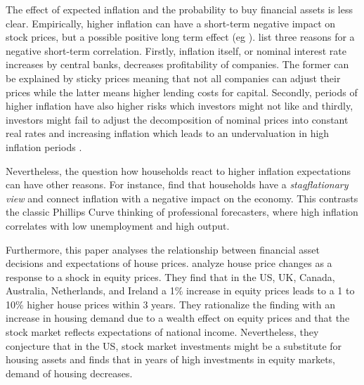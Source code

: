 \documentclass[ProjectABM]{subfiles}
\begin{document}
The effect of expected inflation and the probability to buy financial assets is less clear. Empirically, higher inflation can have a short-term negative impact on stock prices, but a possible positive long term effect (eg \cite{anari_kolari_2001inflation}). \cite{campbell_vuolteenaho_2004inflation} list three reasons for a negative short-term correlation. Firstly, inflation itself, or nominal interest rate increases by central banks, decreases profitability of companies. The former can be explained by sticky prices meaning that not all companies can adjust their prices while the latter means higher lending costs for capital. Secondly, periods of higher inflation have also higher risks which investors might not like and thirdly, investors might fail to adjust the decomposition of nominal prices into constant real rates and increasing inflation which leads to an undervaluation in high inflation periods \citep{modigliani_cohn1979inflation}.

Nevertheless, the question how households react to higher inflation expectations can have other reasons. For instance, \cite{CCG_2020_inflation_communication} find that households have a \textit{stagflationary view} and connect inflation with a negative impact on the economy. This contrasts the classic Phillips Curve thinking of professional forecasters, where high inflation correlates with low unemployment and high output. %


Furthermore, this paper analyses the relationship between financial asset decisions and expectations of house prices. \cite{sutton2002houseprices} analyze house price changes as a response to a shock in equity prices. They find that in the US, UK, Canada, Australia, Netherlands, and Ireland a 1\% increase in equity prices leads to a 1 to 10\% higher house prices within 3 years. They rationalize the finding with an increase in housing demand due to a wealth effect on equity prices and that the stock market reflects expectations of national income. Nevertheless, they conjecture that in the US, stock market investments might be a substitute for housing assets and finds that in years of high investments in equity markets, demand of housing decreases. %
\end{document}
